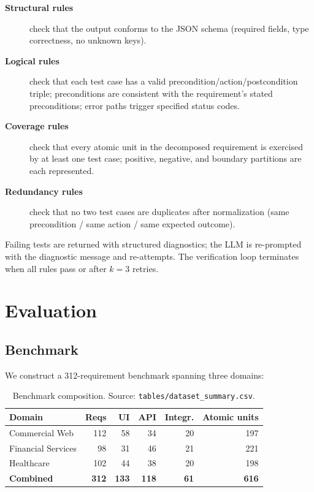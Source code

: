 \documentclass[10pt,twocolumn,letterpaper]{article}
\begin{document}
\begin{description}
  \item[\textbf{Structural rules}] check that the output conforms to
        the JSON schema (required fields, type correctness, no
        unknown keys).
  \item[\textbf{Logical rules}] check that each test case has a valid
        precondition/action/postcondition triple; preconditions are
        consistent with the requirement's stated preconditions; error
        paths trigger specified status codes.
  \item[\textbf{Coverage rules}] check that every atomic unit in the
        decomposed requirement is exercised by at least one test
        case; positive, negative, and boundary partitions are each
        represented.
  \item[\textbf{Redundancy rules}] check that no two test cases are
        duplicates after normalization (same precondition / same
        action / same expected outcome).
\end{description}

Failing tests are returned with structured diagnostics; the LLM is
re-prompted with the diagnostic message and re-attempts. The
verification loop terminates when all rules pass or after $k = 3$
retries.

\section{Evaluation}
\label{sec:eval}

\subsection{Benchmark}

We construct a 312-requirement benchmark spanning three domains:

\begin{table}[H]
\centering
\caption{Benchmark composition.
Source: \texttt{tables/dataset\_summary.csv}.}
\label{tab:bench}
\small
\begin{tabular}{lrrrrr}
\toprule
Domain              & Reqs & UI  & API & Integr. & Atomic units \\
\midrule
Commercial Web      & 112  & 58  & 34  & 20      & 197 \\
Financial Services  &  98  & 31  & 46  & 21      & 221 \\
Healthcare          & 102  & 44  & 38  & 20      & 198 \\
\midrule
\textbf{Combined}   & \textbf{312} & \textbf{133} & \textbf{118} & \textbf{61} & \textbf{616} \\
\bottomrule
\end{tabular}
\end{table}
\end{document}
